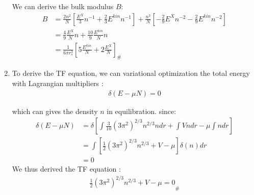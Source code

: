 \documentclass[notitlepage]{revtex4-1}
\begin{document}
\begin{CJK}{UTF8}{bsmi}
\begin{enumerate}
 We can derive the bulk modulus $B$:
 \begin{align*}
 	B &= \frac{2n^2}{N} \left[\frac{E^X}{3} n^{-1} + \frac{2}{3} E^{kin} n^{-1} \right] + \frac{n^3}{N} \left[ -\frac{2}{9} E^X n^{-2} -\frac{2}{9} E^{kin} n^{-2}\right] \\
 	  &= \frac{4}{9} \frac{E^X}{N} n + \frac{10}{9} \frac{E^{kin}}{N} n \\
 	  &= { \frac{1}{6\pi r_s^3} \left[ 5\frac{E^{kin}}{N} + 2\frac{E^X}{N}\right] }_{\#}
 \end{align*}
 
 \item To derive the TF equation, we can variational optimization the total energy with Lagrangian multipliers :
	 \begin{align*}
	 	\delta\left( E -\mu N \right) = 0
	 \end{align*}
 
	 which can gives the density $n$ in equilibration. since:
	 \begin{align*}
	    \delta\left( E -\mu N \right) &=\delta \left[ \int \frac{3}{10} (3\pi^2)^{2/3} n^{2/3}n dr + \int V n dr - \mu \int n dr \right]  \\
	    &= \int \left[ \frac{1}{2} (3\pi^2)^{2/3} n^{2/3} +V -\mu \right] \delta (n) dr \\
	    &= 0
	 \end{align*}
	 We thus derived the TF equation :
	 \begin{align*}
	     {\frac{1}{2}(3\pi^2)^{2/3} n^{2/3} + V - \mu =0}_{\#}  
	 \end{align*}
	 
 
\end{enumerate}






	
\end{CJK}
\end{document}
